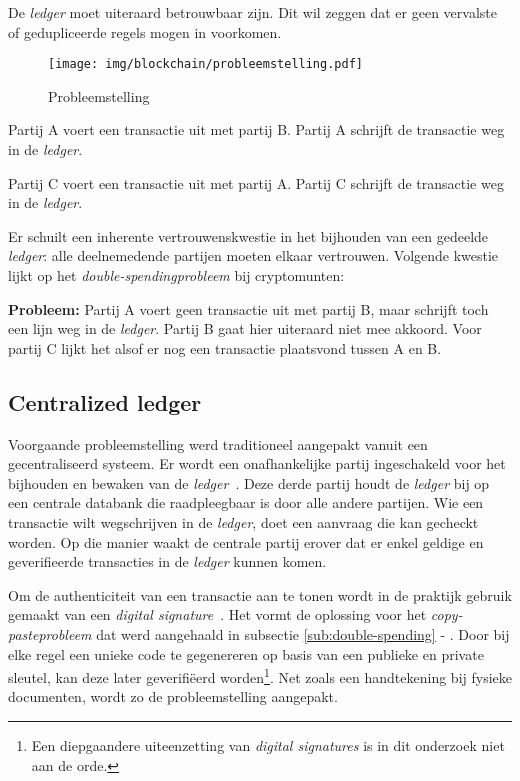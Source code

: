 De \textit{ledger} moet uiteraard betrouwbaar zijn. Dit wil zeggen dat er geen vervalste of gedupliceerde regels mogen in voorkomen.

\begin{figure}[H]
	\centering
	\texttt{[image: img/blockchain/probleemstelling.pdf]}
	\caption{\label{fig:probleemstelling}Probleemstelling}
\end{figure}

\begin{tcolorbox}[title=Voorbeeld]	
Partij A voert een transactie uit met partij B. Partij A schrijft de transactie weg in de \textit{ledger}.

Partij C voert een transactie uit met partij A. Partij C schrijft de transactie weg in de \textit{ledger}.
\end{tcolorbox}

Er schuilt een inherente vertrouwenskwestie in het bijhouden van een gedeelde \textit{ledger}: alle deelnemedende partijen moeten elkaar vertrouwen. Volgende kwestie lijkt op het \textit{double-spendingprobleem} bij cryptomunten:

\textbf{Probleem:} 
Partij A voert geen transactie uit met partij B, maar schrijft toch een lijn weg in de \textit{ledger}. Partij B gaat hier uiteraard niet mee akkoord. Voor partij C lijkt het alsof er nog een transactie plaatsvond tussen A en B.


\subsection{Centralized ledger}
\label{sub:centralized-ledger}

Voorgaande probleemstelling werd traditioneel aangepakt vanuit een gecentraliseerd systeem. Er wordt een onafhankelijke partij ingeschakeld voor het bijhouden en bewaken van de \textit{ledger}~\autocite{Rawat2020}. Deze derde partij houdt de \textit{ledger} bij op een centrale databank die raadpleegbaar is door alle andere partijen. Wie een transactie wilt wegschrijven in de \textit{ledger}, doet een aanvraag die kan gecheckt worden. Op die manier waakt de centrale partij erover dat er enkel geldige en geverifieerde transacties in de \textit{ledger} kunnen komen. 

Om de authenticiteit van een transactie aan te tonen wordt in de praktijk gebruik gemaakt van een \textit{digital signature}~\autocite{Salem2008}. Het vormt de oplossing voor het \textit{copy-pasteprobleem} dat werd aangehaald in subsectie \ref{sub:double-spending} - . Door bij elke regel een unieke code te gegenereren op basis van een publieke en private sleutel, kan deze later geverifiëerd worden\footnote{Een diepgaandere uiteenzetting van \textit{digital signatures} is in dit onderzoek niet aan de orde.}. Net zoals een handtekening bij fysieke documenten, wordt zo de probleemstelling aangepakt.

